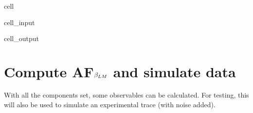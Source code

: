 \documentclass[letterpaper,table,10pt,english]{jupyterBook}
\begin{document}
\begin{sphinxuseclass}{cell}\begin{sphinxVerbatimInput}

\begin{sphinxuseclass}{cell_input}
\begin{sphinxVerbatim}[commandchars=\\\{\}]
\PYG{p}{[}\PYG{p}{]}\PYG{p}{[}\PYG{p}{]}    
\PYG{p}{[}\PYG{p}{]}\PYG{p}{[}\PYG{p}{]}
\end{sphinxVerbatim}

\end{sphinxuseclass}\end{sphinxVerbatimInput}
\begin{sphinxVerbatimOutput}

\begin{sphinxuseclass}{cell_output}
\noindent{}

\end{sphinxuseclass}\end{sphinxVerbatimOutput}

\end{sphinxuseclass}

\section{Compute AF\sphinxhyphen{}\protect\(\beta_{LM}\protect\) and simulate data}
\label{\detokenize{part2/basic_fitting_numerics_intro_260723:compute-af-beta-lm-and-simulate-data}}\label{\detokenize{part2/basic_fitting_numerics_intro_260723:sec-basic-fitting-afblm}}
\sphinxAtStartPar
With all the components set, some observables can be calculated. For testing, this will also be used to simulate an experimental trace (with noise added).
\end{document}
